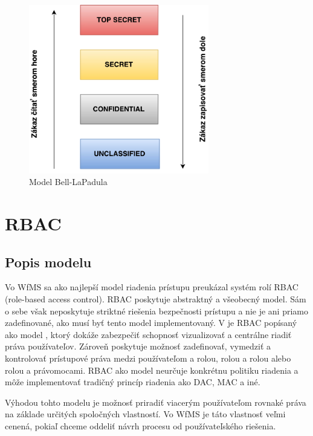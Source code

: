 \begin{figure}[h]
	\centerline{\includegraphics[width=0.7\textwidth]{images/belapadula}}
	\caption{Model Bell-LaPadula}
	\label{obr:belapadula}
\end{figure}







\section{RBAC}
\subsection{Popis modelu}
Vo WfMS sa ako najlepší model riadenia prístupu preukázal systém rolí RBAC (role-based access control). RBAC poskytuje abstraktný a všeobecný model. Sám o sebe však neposkytuje striktné riešenia bezpečnosti prístupu a nie je ani priamo zadefinované, ako musí byť tento model implementovaný. V \cite{ekonomika} je RBAC popísaný ako model , ktorý dokáže zabezpečiť schopnosť vizualizovať a centrálne riadiť práva používateľov. Zároveň poskytuje možnosť zadefinovať, vymedziť a kontrolovať prístupové práva medzi používateľom a rolou, rolou a rolou alebo rolou a právomocami. RBAC ako model neurčuje konkrétnu politiku riadenia a môže implementovať tradičný princíp riadenia ako DAC, MAC a iné. 

Výhodou tohto modelu je možnosť priradiť viacerým používateľom rovnaké práva na základe určitých spoločných vlastností. Vo WfMS je táto vlastnosť veľmi cenená, pokiaľ chceme oddeliť návrh procesu od používateľského riešenia. 


